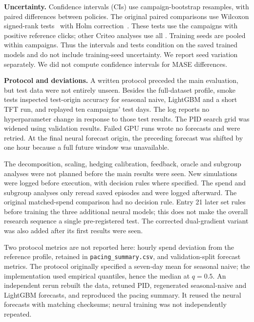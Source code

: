 \documentclass[sigconf,nonacm]{acmart}
\begin{document}
\textbf{Uncertainty.} Confidence intervals (CIs) use
 campaign-bootstrap resamples, with paired differences
between policies. The original  paired comparisons use
Wilcoxon signed-rank tests~\cite{wilcoxon1945individual} with Holm
correction~\cite{holm1979simple}. These tests use the
 campaigns with positive reference clicks; other Criteo
analyses use all . Training seeds are pooled within
campaigns. Thus the intervals and tests condition on the saved trained models
and do not include training-seed uncertainty. We report seed variation
separately. We did not compute confidence intervals for MASE differences.

\textbf{Protocol and deviations.}\label{sec:protocol} A written protocol
preceded the main evaluation, but test data were not entirely unseen. Besides
the full-dataset profile, smoke tests inspected test-origin accuracy for
seasonal naive, LightGBM and a short TFT run, and replayed ten campaigns' test
days. The log reports no hyperparameter change in response to those test
results. The PID search grid was widened using validation results. Failed GPU
runs wrote no forecasts and were retried. At the final neural forecast origin,
the preceding forecast was shifted by one hour because a full future window
was unavailable.

The decomposition, scaling, hedging calibration, feedback, oracle and subgroup
analyses were not planned before the main results were seen. New simulations
were logged before execution, with decision rules where specified. The spend
and subgroup analyses only reread saved episodes and were logged afterward.
The original matched-spend comparison had no decision rule. Entry 21 later
set rules before training the three additional neural models; this does not
make the overall research sequence a single pre-registered test. The corrected
dual-gradient variant was also added after its first results were seen.

Two protocol metrics are not reported here: hourly spend deviation from the
reference profile, retained in \texttt{pacing\_summary.csv}, and validation-split
forecast metrics. The protocol originally specified a seven-day mean for
seasonal naive; the implementation used empirical quantiles, hence the median
at $q=0.5$. An independent rerun rebuilt the data, retuned PID, regenerated
seasonal-naive and LightGBM forecasts, and reproduced the pacing summary. It
reused the neural forecasts with matching checksums; neural training was not
independently repeated.
\end{document}
